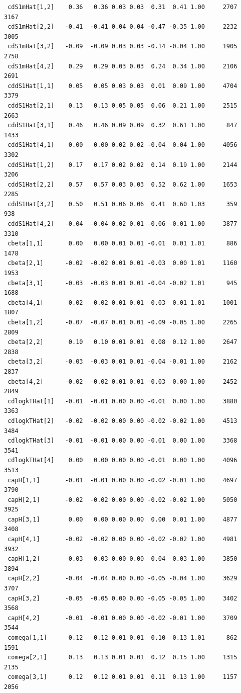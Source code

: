 \documentclass[
]{article}
\begin{document}
\begin{verbatim}
 cdS1mHat[1,2]    0.36   0.36 0.03 0.03  0.31  0.41 1.00     2707     3167
 cdS1mHat[2,2]   -0.41  -0.41 0.04 0.04 -0.47 -0.35 1.00     2232     3005
 cdS1mHat[3,2]   -0.09  -0.09 0.03 0.03 -0.14 -0.04 1.00     1905     2758
 cdS1mHat[4,2]    0.29   0.29 0.03 0.03  0.24  0.34 1.00     2106     2691
 cddS1Hat[1,1]    0.05   0.05 0.03 0.03  0.01  0.09 1.00     4704     3379
 cddS1Hat[2,1]    0.13   0.13 0.05 0.05  0.06  0.21 1.00     2515     2663
 cddS1Hat[3,1]    0.46   0.46 0.09 0.09  0.32  0.61 1.00      847     1433
 cddS1Hat[4,1]    0.00   0.00 0.02 0.02 -0.04  0.04 1.00     4056     3302
 cddS1Hat[1,2]    0.17   0.17 0.02 0.02  0.14  0.19 1.00     2144     3206
 cddS1Hat[2,2]    0.57   0.57 0.03 0.03  0.52  0.62 1.00     1653     2285
 cddS1Hat[3,2]    0.50   0.51 0.06 0.06  0.41  0.60 1.03      359      938
 cddS1Hat[4,2]   -0.04  -0.04 0.02 0.01 -0.06 -0.01 1.00     3877     3310
 cbeta[1,1]       0.00   0.00 0.01 0.01 -0.01  0.01 1.01      886     1478
 cbeta[2,1]      -0.02  -0.02 0.01 0.01 -0.03  0.00 1.01     1160     1953
 cbeta[3,1]      -0.03  -0.03 0.01 0.01 -0.04 -0.02 1.01      945     1688
 cbeta[4,1]      -0.02  -0.02 0.01 0.01 -0.03 -0.01 1.01     1001     1807
 cbeta[1,2]      -0.07  -0.07 0.01 0.01 -0.09 -0.05 1.00     2265     2809
 cbeta[2,2]       0.10   0.10 0.01 0.01  0.08  0.12 1.00     2647     2838
 cbeta[3,2]      -0.03  -0.03 0.01 0.01 -0.04 -0.01 1.00     2162     2837
 cbeta[4,2]      -0.02  -0.02 0.01 0.01 -0.03  0.00 1.00     2452     2849
 cdlogkTHat[1]   -0.01  -0.01 0.00 0.00 -0.01  0.00 1.00     3880     3363
 cdlogkTHat[2]   -0.02  -0.02 0.00 0.00 -0.02 -0.02 1.00     4513     3484
 cdlogkTHat[3]   -0.01  -0.01 0.00 0.00 -0.01  0.00 1.00     3368     3541
 cdlogkTHat[4]    0.00   0.00 0.00 0.00 -0.01  0.00 1.00     4096     3513
 capH[1,1]       -0.01  -0.01 0.00 0.00 -0.02 -0.01 1.00     4697     3790
 capH[2,1]       -0.02  -0.02 0.00 0.00 -0.02 -0.02 1.00     5050     3925
 capH[3,1]        0.00   0.00 0.00 0.00  0.00  0.01 1.00     4877     3408
 capH[4,1]       -0.02  -0.02 0.00 0.00 -0.02 -0.02 1.00     4981     3932
 capH[1,2]       -0.03  -0.03 0.00 0.00 -0.04 -0.03 1.00     3850     3894
 capH[2,2]       -0.04  -0.04 0.00 0.00 -0.05 -0.04 1.00     3629     3707
 capH[3,2]       -0.05  -0.05 0.00 0.00 -0.05 -0.05 1.00     3402     3568
 capH[4,2]       -0.01  -0.01 0.00 0.00 -0.02 -0.01 1.00     3709     3544
 comega[1,1]      0.12   0.12 0.01 0.01  0.10  0.13 1.01      862     1591
 comega[2,1]      0.13   0.13 0.01 0.01  0.12  0.15 1.00     1315     2135
 comega[3,1]      0.12   0.12 0.01 0.01  0.11  0.13 1.00     1157     2056

\end{verbatim}
\end{document}

